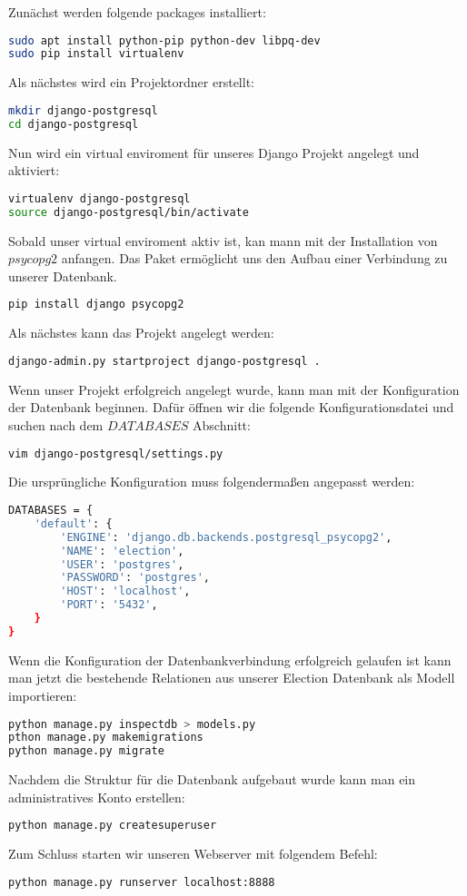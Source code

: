 \documentclass[12pt]{article}
\begin{document}
Zunächst werden folgende packages installiert:
\begin{lstlisting}[language=sh, frame=single]
sudo apt install python-pip python-dev libpq-dev
sudo pip install virtualenv
\end{lstlisting}
Als nächstes wird ein Projektordner erstellt:
\begin{lstlisting}[language=sh, frame=single]
mkdir django-postgresql
cd django-postgresql
\end{lstlisting}
Nun wird ein virtual enviroment für unseres Django Projekt angelegt und aktiviert:
\begin{lstlisting}[language=sh, frame=single]
virtualenv django-postgresql
source django-postgresql/bin/activate
\end{lstlisting}
Sobald unser virtual enviroment aktiv ist, kan mann mit der Installation von $psycopg2$ anfangen. Das Paket ermöglicht uns den Aufbau einer Verbindung zu unserer Datenbank.
\begin{lstlisting}[language=sh, frame=single]
pip install django psycopg2
\end{lstlisting}
Als nächstes kann das Projekt angelegt werden:
\begin{lstlisting}[language=sh, frame=single]
django-admin.py startproject django-postgresql .
\end{lstlisting}
Wenn unser Projekt erfolgreich angelegt wurde, kann man mit der Konfiguration der Datenbank beginnen. Dafür öffnen wir die folgende Konfigurationsdatei und suchen nach dem $DATABASES$ Abschnitt:
\begin{lstlisting}[language=sh, frame=single]
vim django-postgresql/settings.py
\end{lstlisting}
Die ursprüngliche Konfiguration muss folgendermaßen angepasst werden:
\begin{lstlisting}[language=sh, frame=single]
DATABASES = {
    'default': {
        'ENGINE': 'django.db.backends.postgresql_psycopg2',
        'NAME': 'election',
        'USER': 'postgres',
        'PASSWORD': 'postgres',
        'HOST': 'localhost',
        'PORT': '5432',
    }
}
\end{lstlisting}
Wenn die Konfiguration der Datenbankverbindung erfolgreich gelaufen ist kann man jetzt die bestehende Relationen aus unserer Election Datenbank als Modell importieren:
\begin{lstlisting}[language=sh, frame=single]
python manage.py inspectdb > models.py
pthon manage.py makemigrations
python manage.py migrate
\end{lstlisting}
Nachdem die Struktur für die Datenbank aufgebaut wurde kann man ein administratives Konto erstellen:
\begin{lstlisting}[language=sh, frame=single]
python manage.py createsuperuser
\end{lstlisting}
Zum Schluss starten wir unseren Webserver mit folgendem Befehl:
\begin{lstlisting}[language=sh, frame=single]
python manage.py runserver localhost:8888
\end{lstlisting}
\end{document}
